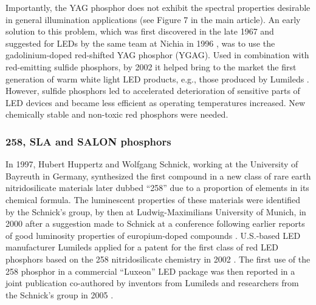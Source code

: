 \documentclass[10pt]{article}
\begin{document}
Importantly, the YAG phosphor does not exhibit the spectral properties desirable in general illumination applications (see Figure 7 in the main article). An early solution to this problem, which was first discovered in the late 1967 \cite{holloway1969optical} and suggested for LEDs by the same team at Nichia in 1996 \cite{bando1998development}\cite{shimizu1999light}, was to use the gadolinium-doped red-shifted YAG phosphor (YGAG). Used in combination with red-emitting sulfide phosphors, by 2002 it helped bring to the market the first generation of warm white light LED products, e.g., those produced by Lumileds \cite{Mueller2002}. However, sulfide phosphors led to accelerated deterioration of sensitive parts of LED devices and became less efficient as operating temperatures increased. New chemically stable and non-toxic red phosphors were needed. 

\subsubsection{258, SLA and SALON phosphors}

In 1997, Hubert Huppertz and Wolfgang Schnick, working at the University of Bayreuth in Germany, synthesized the first compound in a new class of rare earth nitridosilicate materials \cite{Huppertz1997} later dubbed “258” due to a proportion of elements in its chemical formula. The luminescent properties of these materials were identified by the Schnick’s group, by then at Ludwig-Maximilians University of Munich, in 2000 \cite{Hppe2000} after a suggestion made to Schnick at a conference following earlier reports of good luminosity properties of europium-doped compounds \cite{Qiua1998}. U.S.-based LED manufacturer Lumileds applied for a patent for the first class of red LED phosphors based on the 258 nitridosilicate chemistry in 2002 \cite{mueller2004phosphor}. The first use of the 258 phosphor in a commercial “Luxeon” LED package was then reported in a joint publication co-authored by inventors from Lumileds and researchers from the Schnick’s group in 2005 \cite{MuellerMach2005}.
\end{document}
